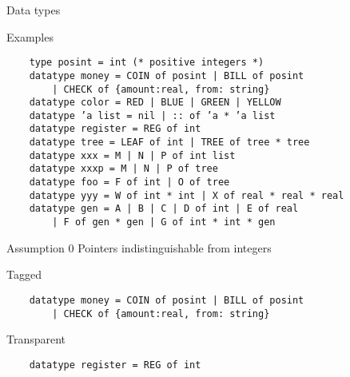\documentclass[presentation]{beamer}
\begin{document}
\begin{frame}[fragile]{Data types}
  \begin{block}{Examples}
\begin{verbatim}
    type posint = int (* positive integers *)
    datatype money = COIN of posint | BILL of posint
        | CHECK of {amount:real, from: string}
    datatype color = RED | BLUE | GREEN | YELLOW
    datatype ’a list = nil | :: of ’a * ’a list
    datatype register = REG of int
    datatype tree = LEAF of int | TREE of tree * tree
    datatype xxx = M | N | P of int list
    datatype xxxp = M | N | P of tree
    datatype foo = F of int | O of tree
    datatype yyy = W of int * int | X of real * real * real
    datatype gen = A | B | C | D of int | E of real
        | F of gen * gen | G of int * int * gen
\end{verbatim}
  \end{block}
\end{frame}

\begin{frame}[fragile]{Assumption 0}
 Pointers indistinguishable from integers
  \begin{block}{Tagged}
\begin{verbatim}
    datatype money = COIN of posint | BILL of posint
        | CHECK of {amount:real, from: string}
\end{verbatim}
  \end{block}
  \pause
  \begin{block}{Transparent}
\begin{verbatim}
    datatype register = REG of int
\end{verbatim}
  \end{block}
\end{frame}
\end{document}
